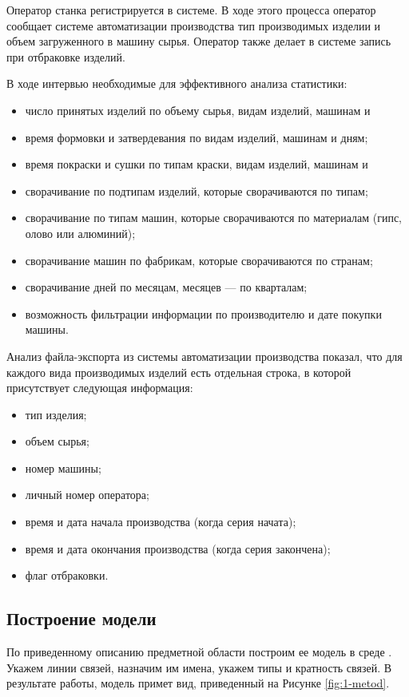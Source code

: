 Оператор станка регистрируется в системе. В ходе этого процесса оператор
сообщает системе автоматизации производства тип производимых изделии и
объем загруженного в машину сырья. Оператор также делает в системе запись
при отбраковке изделий.

В ходе
интервью необходимые для эффективного анализа статистики:
\begin{itemize}
	
	\item  число принятых изделий по объему сырья, видам изделий, машинам и
	\item  время формовки и затвердевания по видам изделий, машинам и дням;
	\item  время покраски и сушки по типам краски, видам изделий, машинам и
	\item  сворачивание по подтипам изделий, которые сворачиваются по типам;
	\item  сворачивание по типам машин, которые сворачиваются по материалам
	(гипс, олово или алюминий);
	\item  сворачивание машин по фабрикам, которые сворачиваются по странам;
	\item  сворачивание дней по месяцам, месяцев — по кварталам;
	\item  возможность фильтрации информации по производителю и дате покупки машины.
\end{itemize}

Анализ файла-экспорта из системы автоматизации производства показал,
что для каждого вида производимых изделий есть отдельная строка, в которой
присутствует следующая информация:
\begin{itemize}
	\item  тип изделия;
	\item  объем сырья;
	\item  номер машины;
	\item  личный номер оператора;
	\item  время и дата начала производства (когда серия начата);
	\item  время и дата окончания производства (когда серия закончена);
	\item  флаг отбраковки.
\end{itemize}
\subsection{Построение модели}
По приведенному описанию предметной области построим ее модель в среде \erassistant. Укажем линии связей, назначим им имена, укажем типы и кратность связей. В результате работы, модель примет вид, приведенный на Рисунке \ref{fig:1-metod}.

